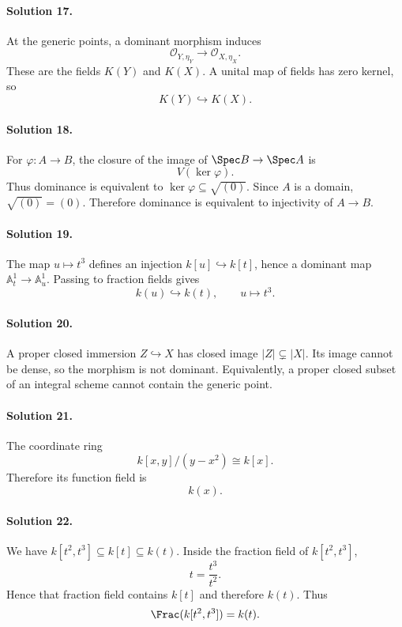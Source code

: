 \paragraph{Solution 17.}
At the generic points, a dominant morphism induces
\[
\mathcal O_{Y,\eta_Y}\to\mathcal O_{X,\eta_X}.
\]
These are the fields \(K(Y)\) and \(K(X)\). A unital map of fields has zero kernel, so
\[
K(Y)\hookrightarrow K(X).
\]

\paragraph{Solution 18.}
For \(\varphi:A\to B\), the closure of the image of \(\Spec B\to\Spec A\) is
\[
V(\ker\varphi).
\]
Thus dominance is equivalent to \(\ker\varphi\subseteq\sqrt{(0)}\). Since \(A\) is a domain,
\(\sqrt{(0)}=(0)\). Therefore dominance is equivalent to injectivity of \(A\to B\).

\paragraph{Solution 19.}
The map \(u\mapsto t^3\) defines an injection \(k[u]\hookrightarrow k[t]\), hence a dominant map
\(\mathbb A^1_t\to\mathbb A^1_u\). Passing to fraction fields gives
\[
k(u)\hookrightarrow k(t),\qquad u\mapsto t^3.
\]

\paragraph{Solution 20.}
A proper closed immersion \(Z\hookrightarrow X\) has closed image \(|Z|\subsetneq|X|\). Its image
cannot be dense, so the morphism is not dominant. Equivalently, a proper closed subset of an
integral scheme cannot contain the generic point.

\paragraph{Solution 21.}
The coordinate ring
\[
k[x,y]/(y-x^2)\cong k[x].
\]
Therefore its function field is
\[
k(x).
\]

\paragraph{Solution 22.}
We have \(k[t^2,t^3]\subseteq k[t]\subseteq k(t)\). Inside the fraction field of
\(k[t^2,t^3]\),
\[
t=\frac{t^3}{t^2}.
\]
Hence that fraction field contains \(k[t]\) and therefore \(k(t)\). Thus
\[
\Frac(k[t^2,t^3])=k(t).
\]

